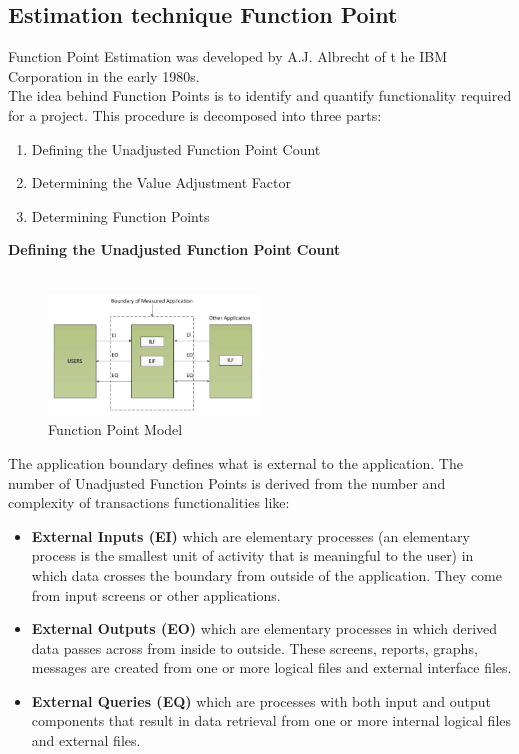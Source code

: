\documentclass[
	11pt,
	a4paper
]{article}%
\begin{document}
\subsection{Estimation technique Function Point}
Function Point Estimation was developed by A.J. Albrecht of t he IBM Corporation in the early 1980s. 
\\
The idea behind Function Points is to identify and quantify functionality required for a project. This procedure is decomposed into three parts:
\begin{enumerate}
\item Defining the Unadjusted Function Point Count
\item Determining the Value Adjustment Factor
\item Determining Function Points
\end{enumerate}
\textbf{Defining the Unadjusted Function Point Count}\\\\
\begin{figure}[h!]
  \caption{Function Point Model}
  \centering
    \includegraphics[width=0.5\textwidth]{../Images/FP_model.png}
\end{figure}
The application boundary defines what is external to the application. The number of Unadjusted Function Points is derived from the number and complexity of transactions functionalities like:
\begin{itemize}
\item \textbf{External Inputs (EI)} which are elementary processes (an elementary process is the smallest unit of activity that is meaningful to the user) in which data crosses the boundary from outside of the application. They come from input screens or other applications.
\item \textbf{External Outputs (EO)} which are elementary processes in which derived data passes across from inside to outside.  These screens, reports, graphs, messages are created from one or more logical files and external interface files.
\item \textbf{External Queries (EQ)} which are processes with both input and output components that  result in data retrieval from one or more internal logical files and external files.
\end{itemize}
\end{document}
